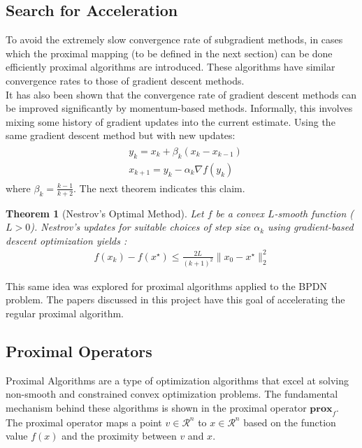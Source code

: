 \documentclass[10pt]{article} %
\newtheorem{theorem}{Theorem}
\begin{document}
\subsection{Search for Acceleration}

To avoid the extremely slow convergence rate of subgradient methods, in cases which the proximal mapping (to be defined in the next section) can be done efficiently proximal algorithms are introduced. These algorithms have similar convergence rates to those of gradient descent methods.\\
It has also been shown that the convergence rate of gradient descent methods can be improved significantly by momentum-based methods. Informally, this involves mixing some history of gradient updates into the current estimate. Using the same gradient descent method but with new updates:
\begin{eqnarray*}
\begin{aligned}
    &y_k = x_k+ \beta_k(x_k-x_{k-1})\\
    &x_{k+1}=y_k-\alpha_k\nabla f(y_k)
    \end{aligned}
\end{eqnarray*}
where $\beta_k=\frac{k-1}{k+2}$.
The next theorem indicates this claim.

\begin{theorem}[Nestrov's Optimal Method]
Let $f$ be a convex $L$-smooth function ($L>0$). Nestrov's updates for suitable choices of step size $\alpha_k$ using gradient-based descent optimization yields \cite{romberg2022}:
    \begin{align*}
        f(x_k)-f(x^\star)\leq\frac{2L}{(k+1)^2}\|x_0-x^\star\|_2^2
    \end{align*}
\end{theorem}

This same idea was explored for proximal algorithms applied to the BPDN problem. The papers \citep{beck2009fast,wright2009sparse} discussed in this project have this goal of accelerating the regular proximal algorithm.

\subsection{Proximal Operators}

Proximal Algorithms are a type of optimization algorithms that excel at solving non-smooth and constrained convex optimization problems. The fundamental mechanism behind these algorithms is shown in the proximal operator $\mathbf{prox}_f$. The proximal operator maps a point $v \in \mathcal{R}^n$ to $x \in \mathcal{R}^n$ based on the function value $f(x)$ and the proximity between $v$ and $x$.  
\end{document}

